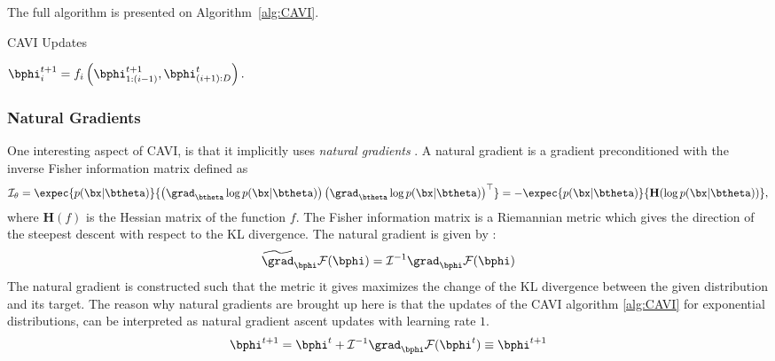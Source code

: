 The full algorithm is presented on Algorithm~\ref{alg:CAVI}.

\begin{algorithm}
    \caption{\ac{CAVI} Updates}
    \label{alg:CAVI}
    \begin{algorithmic}
                \State $\bphi_i^{t+1} = f_i\left(\bphi_{1:(i-1)}^{t+1}, \bphi_{(i+1):D}^t\right).$
            \EndFor
        \EndWhile
    \end{algorithmic}
\end{algorithm}


\subsubsection{Natural Gradients}

One interesting aspect of \ac{CAVI}, is that it implicitly uses \textit{natural gradients} \cite{amariNaturalGradientWorks1998}.
A natural gradient is a gradient preconditioned with the inverse Fisher information matrix defined as
\begin{align}
    \mathcal{I}_\theta = \expec{p(\bx|\btheta)}{\left(\grad_{\btheta}\log p(\bx|\btheta)\right)\left(\grad_{\btheta} \log p(\bx|\btheta)\right)^\top} = -\expec{p(\bx|\btheta)}{\mathbf{H}(\log p(\bx|\btheta))},
    \label{eq:fisherinfomatrix}
\end{align}
where $\mathbf{H}(f)$ is the Hessian matrix of the function $f$.
The Fisher information matrix is a Riemannian metric which gives the direction of the steepest descent with respect to the KL divergence.
The natural gradient is given by :
\begin{align*}
    \widetilde{\grad}_{\bphi}\mathcal{F}(\bphi) = \mathcal{I}^{-1} \grad_{\bphi}\mathcal{F}(\bphi)
\end{align*}
The natural gradient is constructed such that the metric it gives maximizes the change of the \ac{KL} divergence between the given distribution and its target.
The reason why natural gradients are brought up here is that the updates of the \ac{CAVI} algorithm \ref{alg:CAVI} for exponential distributions, can be interpreted as natural gradient ascent updates with learning rate $1$.
\begin{align*}
    \bphi^{t+1} = \bphi^t + \mathcal{I}^{-1}\grad_{\bphi}\mathcal{F}(\bphi^t) \equiv \bphi^{t+1}
\end{align*}


